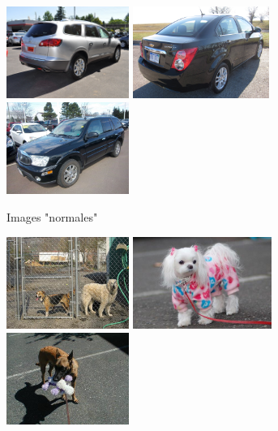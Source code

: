 \begin{figure} [htb]
	\begin{subfigure}{.33\textwidth}
		\centering
		\includegraphics[width=.8\linewidth,height=3cm]{images/images_anomalies/inlier-1}
		\includegraphics[width=.8\linewidth,height=3cm]{images/images_anomalies/inlier-2}
		\includegraphics[width=.8\linewidth,height=3cm]{images/images_anomalies/inlier-3}
		\caption{Images "normales"}
		\label{fig:sfig1}
	\end{subfigure}%
	\begin{subfigure}{.33\textwidth}
		\centering
		\includegraphics[width=.8\linewidth,height=3cm]{images/images_anomalies/anomalie-1}
		\includegraphics[width=.8\linewidth,height=3cm]{images/images_anomalies/anomalie-2}
		\includegraphics[width=.8\linewidth,height=3cm]{images/images_anomalies/anomalie-3}

\end{subfigure}
\end{figure}
